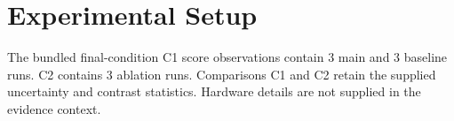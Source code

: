 \section{Experimental Setup}
The bundled final-condition C1 score observations contain 3 main and 3 baseline runs. C2 contains 3 ablation runs. Comparisons C1 and C2 retain the supplied uncertainty and contrast statistics. Hardware details are not supplied in the evidence context.
